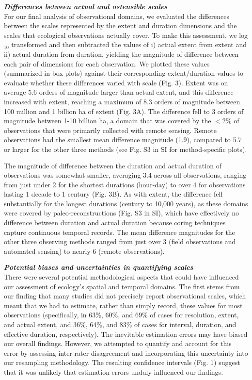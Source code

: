 \documentclass[12pt]{article}
\begin{document}
\noindent \textbf{\emph{Differences between actual and ostensible scales}}\\
For our final analysis of observational domains, we evaluated the differences between the scales represented by the extent and duration dimensions and the scales that ecological observations actually cover. To make this assessment, we log$_{10}$ transformed and then subtracted the values of i) actual extent from extent and ii) actual duration from duration, yielding the magnitude of difference between each pair of dimensions for each observation. We plotted these values (summarized in box plots) against their corresponding extent/duration values to evaluate whether these differences varied with scale (Fig. 3). Extent was on average 5.6 orders of magnitude larger than actual extent, and this difference increased with extent, reaching a maximum of 8.3 orders of magnitude between 100 million and 1 billion ha of extent (Fig. 3A). The difference fell to 3 orders of magnitude between 1-10 billion ha, a domain that was covered by the $<$2\% of observations that were primarily collected with remote sensing. Remote observations had the smallest mean difference magnitude (1.9), compared to 5.7 or larger for the other three methods (see Fig. S3 in SI for method-specific plots). 

The magnitude of difference between the duration and actual duration of observations was somewhat smaller, averaging 3.4 across all observations, ranging from just under 2 for the shortest durations (hour-day) to over 4 for observations lasting 1 decade to 1 century (Fig. 3B). As with extent, the difference fell substantially for the longest durations (century to 10,000 years), as these domains were covered by paleo-reconstructions (Fig. S3 in SI), which have effectively no difference between duration and actual duration because coring techniques capture continuous temporal records. The mean difference magnitudes for the other three observing methods ranged from just over 3 (field observations and automated sensing) to nearly 6 (remote observations). 

\noindent \textbf{\emph{Potential biases and uncertainties in quantifying scales}}\\
There were several potential methodological aspects that could have influenced our assessment of ecology's spatial and temporal domains. The first stems from our finding that many studies did not precisely report observational scales, which meant that we had to estimate, rather than simply record, these values for most observations (specifically, in 63\%, 60\%, and 69\% of cases for resolution, extent, and actual extent, and 36\%, 64\%, and 83\% of cases for interval, duration, and effective duration, respectively). The inevitable estimation errors may have biased our overall findings. However, we attempted to quantify and account for this error by assessing inter-rater disagreement and incorporating this uncertainty into our resampling methodology. The resulting confidence intervals (Fig. 1) suggest that it was unlikely that estimation errors unduly influenced our findings. 
\end{document}
